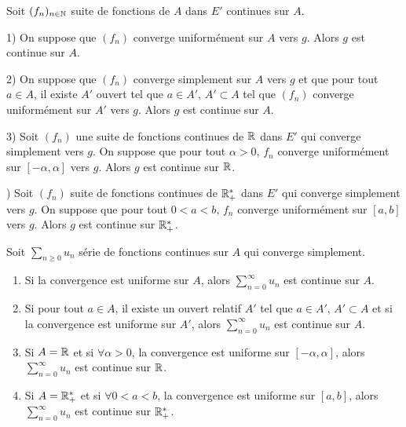 \begin{theoreme}{}{}
    Soit $(f_n)_{n \in \mathbb{N}}$ suite de fonctions de $A$ dans $E'$ continues sur $A$. 
    
    1) On suppose que $(f_n)$ converge uniformément sur $A$ vers $g$. Alors $g$ est continue sur $A$.


    2) On suppose que $(f_n)$ converge simplement sur $A$ vers $g$ et que pour tout $a \in A$,
    il existe $A'$ ouvert tel que $a \in A', \, A' \subset A$ tel que $(f_n)$ converge uniformément sur $A'$ vers $g$.
    Alors $g$ est continue sur $A$.


    3) Soit $(f_n)$ une suite de fonctions continues de $\mathbb{R}$ dans $E'$ qui converge simplement vers $g$. 
    On suppose que pour tout $\alpha > 0, \, f_n$ converge uniformément sur $[-\alpha, \alpha]$ vers $g$.
    Alors $g$ est continue sur $\mathbb{R}$.

    ) Soit $(f_n)$ suite de fonctions continues de $\mathbb{R}_+^*$ dans $E'$ qui converge simplement vers $g$. 
    On suppose que pour tout $0<a<b, \, f_n$ converge uniformément sur $[a, b]$ vers $g$.
    Alors $g$ est continue sur $\mathbb{R}_+^*$.
\end{theoreme}

\begin{theoreme}{}{}
    Soit $\sum_{n \geqslant 0 } u_n$ série de fonctions continues sur $A$ qui converge 
    simplement. 

    \begin{enumerate}
        \item Si la convergence est uniforme sur $A$, alors $\displaystyle \sum_{n = 0}^{\infty} u_n$ est continue sur $A$.
        \item Si pour tout $a \in A$, il existe un ouvert relatif $A'$ tel que $a \in A', \, A' \subset A$ et
        si la convergence est uniforme sur $A'$, alors $\displaystyle \sum_{n = 0}^{\infty} u_n$ est continue sur $A$.
        \item Si $A = \mathbb{R}$ et si $\forall \alpha > 0$, la convergence est uniforme sur $[-\alpha, \alpha]$, 
        alors $\displaystyle \sum_{n = 0}^{\infty} u_n$ est continue sur $\mathbb{R}$.
        \item Si $A = \mathbb{R}_+^*$ et si $\forall 0 < a < b$, la convergence est uniforme sur $[a, b]$,
        alors $\displaystyle \sum_{n = 0}^{\infty} u_n$ est continue sur $\mathbb{R}_+^*$.
    \end{enumerate}
\end{theoreme}

